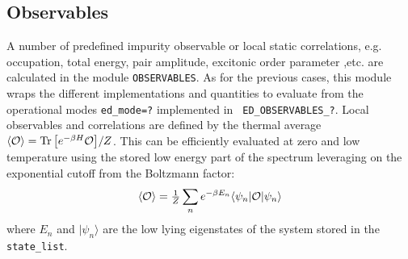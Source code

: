 \documentclass[preprint,3p,10pt]{elsarticle}
\newcommand{\ket}[1]
{|#1\rangle}
\newcommand{\bra}[1]
{\langle #1|}
\def\ibra{\langle}
\def\iket{\rangle}
\begin{document}
\subsection{Observables}\label{sSecObc}
A number of predefined impurity observable or local static
correlations, e.g. occupation, total energy, pair amplitude, excitonic
order parameter ,etc.   are calculated in the module
\texttt{OBSERVABLES}. As for the previous cases, this module wraps the
different implementations and quantities to evaluate from the
operational modes {\tt ed\_mode=?} implemented in {\tt
  ED\_OBSERVABLES\_?}. 
Local observables and correlations are defined by the thermal average  $\ibra \OO\iket =
\Tr{\left[e^{-\beta H}\OO\right]}/Z$. This can be efficiently evaluated at zero and
low temperature using the stored low energy part of the spectrum
leveraging on the exponential cutoff from the Boltzmann factor:
$$
\ibra \OO\iket  = \tfrac{1}{Z}\sum_n e^{-\beta
  E_n}\bra{\psi_n}\OO\ket{\psi_n}
$$
where $E_n$ and $\ket{\psi_n}$ are the low lying eigenstates of the
system stored in the {\tt state\_list}. 
\end{document}
